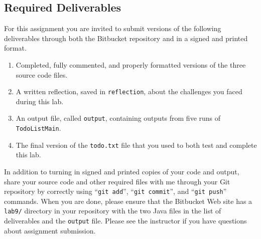 
\vspace{-0.3in}
\subsection*{Required Deliverables}
\vspace{-0.05in}

For this assignment you are invited to submit versions of the following deliverables through both the Bitbucket
repository and in a signed and printed format.

\vspace{-0.1in}
\begin{enumerate}
    \setlength{\itemsep}{0pt}

  \item Completed, fully commented, and properly formatted versions of the three source code files.

  \item A written reflection, saved in {\tt reflection}, about the challenges you faced during this lab.

  \item An output file, called {\tt output}, containing outputs from five runs of {\tt TodoListMain}.

  \item The final version of the {\tt todo.txt} file that you used to both test and complete this lab.
        
\end{enumerate}
\vspace{-0.1in}

In addition to turning in signed and printed copies of your code and output, share your source code and other required
files with me through your Git repository by correctly using ``{\tt git add}'', ``{\tt git commit}'', and ``{\tt git
  push}'' commands. When you are done, please ensure that the Bitbucket Web site has a {\tt lab9/} directory in your
repository with the two Java files in the list of deliverables and the {\tt output} file. Please see the instructor if
you have questions about assignment submission.


